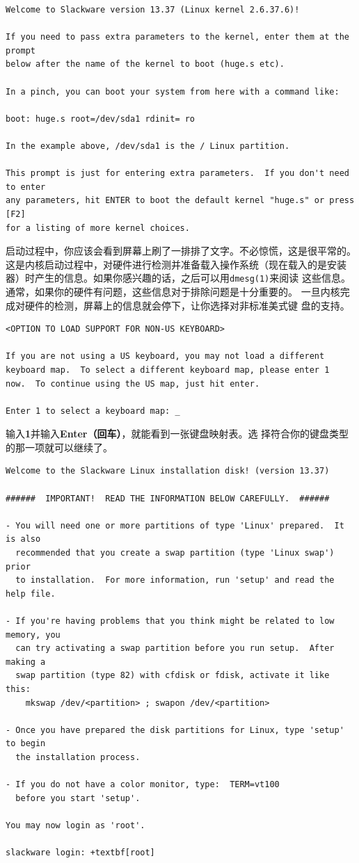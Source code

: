 \begin{Verbatim}[frame=single]
Welcome to Slackware version 13.37 (Linux kernel 2.6.37.6)!

If you need to pass extra parameters to the kernel, enter them at the prompt
below after the name of the kernel to boot (huge.s etc).

In a pinch, you can boot your system from here with a command like:

boot: huge.s root=/dev/sda1 rdinit= ro 

In the example above, /dev/sda1 is the / Linux partition.

This prompt is just for entering extra parameters.  If you don't need to enter
any parameters, hit ENTER to boot the default kernel "huge.s" or press [F2] 
for a listing of more kernel choices.
\end{Verbatim}
启动过程中，你应该会看到屏幕上刷了一排排了文字。不必惊慌，这是很平常的。
这是内核启动过程中，对硬件进行检测并准备载入操作系统（现在载入的是安装
器）时产生的信息。如果你感兴趣的话，之后可以用\texttt{dmesg(1)}来阅读
这些信息。通常，如果你的硬件有问题，这些信息对于排除问题是十分重要的。
一旦内核完成对硬件的检测，屏幕上的信息就会停下，让你选择对非标准美式键
盘的支持。
\begin{Verbatim}[frame=single]
<OPTION TO LOAD SUPPORT FOR NON-US KEYBOARD>

If you are not using a US keyboard, you may not load a different
keyboard map.  To select a different keyboard map, please enter 1
now.  To continue using the US map, just hit enter.

Enter 1 to select a keyboard map: _
\end{Verbatim}
输入\textbf{1}并输入\textbf{Enter（回车）}，就能看到一张键盘映射表。选
择符合你的键盘类型的那一项就可以继续了。
\begin{Verbatim}[frame=single,commandchars=+\[\]]
Welcome to the Slackware Linux installation disk! (version 13.37)

######  IMPORTANT!  READ THE INFORMATION BELOW CAREFULLY.  ######

- You will need one or more partitions of type 'Linux' prepared.  It is also
  recommended that you create a swap partition (type 'Linux swap') prior
  to installation.  For more information, run 'setup' and read the help file.

- If you're having problems that you think might be related to low memory, you
  can try activating a swap partition before you run setup.  After making a
  swap partition (type 82) with cfdisk or fdisk, activate it like this:
    mkswap /dev/<partition> ; swapon /dev/<partition>

- Once you have prepared the disk partitions for Linux, type 'setup' to begin
  the installation process.

- If you do not have a color monitor, type:  TERM=vt100
  before you start 'setup'.

You may now login as 'root'.

slackware login: +textbf[root]
\end{Verbatim}

